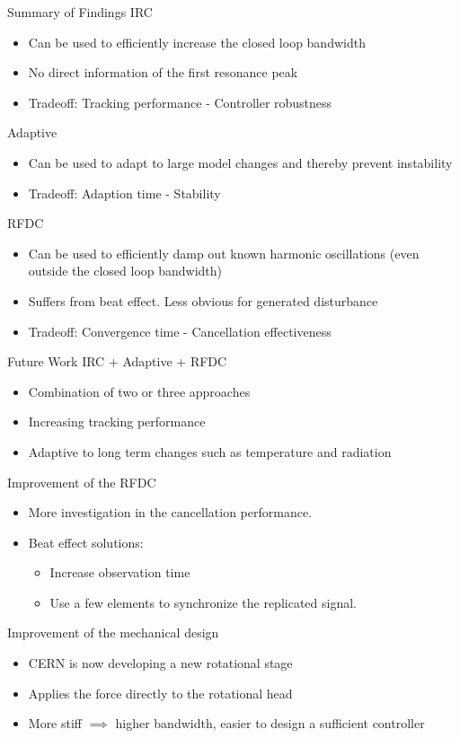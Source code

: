 \documentclass[10pt]{beamer}
\begin{document}
\begin{frame}{Summary of Findings}
  IRC
  \begin{itemize}
    \item  Can be used to efficiently increase the closed loop bandwidth
    \item  No direct information of the first resonance peak
    \item  Tradeoff: Tracking performance - Controller robustness
  \end{itemize}
  Adaptive
  \begin{itemize}
    \item Can be used to adapt to large model changes and thereby prevent instability
    \item Tradeoff: Adaption time - Stability
  \end{itemize}
  RFDC
  \begin{itemize}
    \item Can be used to efficiently damp out known harmonic oscillations (even outside the closed loop bandwidth)
    \item Suffers from beat effect. Less obvious for generated disturbance
    \item Tradeoff: Convergence time - Cancellation effectiveness
  \end{itemize}
\end{frame}

\begin{frame}{Future Work}
  IRC + Adaptive + RFDC
  \begin{itemize}
    \item Combination of two or three approaches
    \item Increasing tracking performance
    \item Adaptive to long term changes such as temperature and radiation
  \end{itemize}
  Improvement of the RFDC
  \begin{itemize}
    \item More investigation in the cancellation performance.
    \item Beat effect solutions:
    \begin{itemize}
      \item Increase observation time
      \item Use a few elements to synchronize the replicated signal.
    \end{itemize}
  \end{itemize}
  Improvement of the mechanical design
  \begin{itemize}
    \item CERN is now developing a new rotational stage
    \item Applies the force directly to the rotational head
    \item More stiff $\implies$ higher bandwidth, easier to design a sufficient controller
  \end{itemize}
\end{frame}
\end{document}
